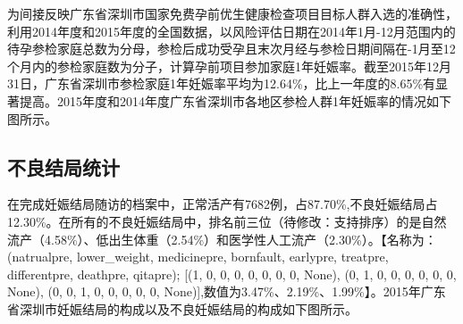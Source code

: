 为间接反映广东省深圳市国家免费孕前优生健康检查项目目标人群入选的准确性，利用2014年度和2015年度的全国数据，以风险评估日期在2014年1月-12月范围内的待孕参检家庭总数为分母，参检后成功受孕且末次月经与参检日期间隔在-1月至12个月内的参检家庭数为分子，计算孕前项目参加家庭1年妊娠率。截至2015年12月31日，广东省深圳市参检家庭1年妊娠率平均为12.64\%，比上一年度的8.65\%有显著提高。2015年度和2014年度广东省深圳市各地区参检人群1年妊娠率的情况如下图所示。



\subsection{不良结局统计}

在完成妊娠结局随访的档案中，正常活产有7682例，占87.70\%,不良妊娠结局占12.30\%。在所有的不良妊娠结局中，排名前三位（待修改：支持排序）的是自然流产（4.58\%）、低出生体重（2.54\%）和医学性人工流产（2.30\%）。【名称为：(natrualpre, lower\_weight, medicinepre, bornfault, earlypre, treatpre, differentpre, deathpre, qitapre); [(1, 0, 0, 0, 0, 0, 0, 0, None), (0, 1, 0, 0, 0, 0, 0, 0, None), (0, 0, 1, 0, 0, 0, 0, 0, None)],数值为3.47\%、2.19\%、1.99\%】。2015年广东省深圳市妊娠结局的构成以及不良妊娠结局的构成如下图所示。





